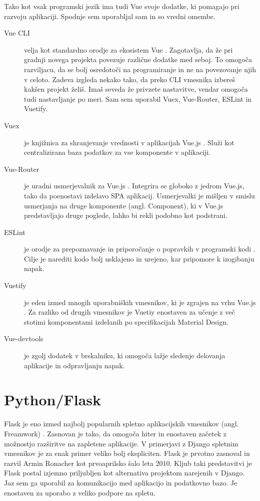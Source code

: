 \documentclass[a4paper, 12pt]{book}
\begin{document}
Tako kot vsak programski jezik ima tudi Vue svoje dodatke, ki pomagajo pri razvoju aplikaciji. Spodnje sem uporabljal sam in so vredni omembe.
\begin{description}
\item[Vue CLI] velja kot standardno orodje za ekosistem Vue \cite{VueCLI}. Zagotavlja, da že pri gradnji novega projekta povezuje različne dodatke med seboj. To omogoča razviljacu, da se bolj osredotoči na programiranje in ne na povezovanje njih v celoto. Zadeva izgleda nekako tako, da preko CLI vmesnika izbereš kakšen projekt želiš. Imaš seveda že privzete nastavitve, vendar omogoča tudi nastavljanje po meri. Sam sem uporabil Vuex, Vue-Router, ESLint in Vuetify.
\item[Vuex] je knjižnica za shranjevanje vrednosti v aplikacijah Vue.js \cite{Vuex}. Služi kot centralizirana baza podatkov za vse komponente v aplikaciji. 
\item[Vue-Router] je uradni usmerjevalnik za Vue.js \cite{VueRouter}. Integrira se globoko z jedrom Vue.js, tako da poenostavi izdelavo SPA aplikacij. Usmerjevalki je mišljen v smislu usmerjanja na druge komponente (angl. Component), ki v Vue.js predstavljajo druge poglede, lahko bi rekli podobno kot podstrani.
\item[ESLint] je orodje za prepoznavanje in priporočanje o popravkih v programski kodi \cite{ESLint}. Cilje je narediti kodo bolj usklajeno in urejeno, kar pripomore k izogibanju napak.
\item[Vuetify] je eden izmed mnogih uporabniških vmesnikov, ki je zgrajen na vrhu Vue.js \cite{Vuetify}. Za razliko od drugih vmesnikov je Vuetiy enostaven za učenje z več stotimi komponentami izdelanih po specifikacijah Material Design.
\item[Vue-devtools] je zgolj dodatek v brskalniku, ki omogoča lažje sledenje delovanja aplikacije in odpravljanju napak. 
\end{description}


\section {Python/Flask}
Flask je eno izmed najbolj popularnih spletno aplikacijskih vmesnikov (angl. Freamwork) \cite{Flask}. Zasnovan je tako, da omogoča hiter in enostaven začetek z možnostjo razširitve na zapletene aplikacije. V primerjavi z Django spletnim vmesnikov je za enak primer veliko bolj ekspliciten. Flask je prvotno zasnoval in razvil Armin Ronacher kot prvoaprilsko šalo leta 2010. Kljub taki predstavitvi je Flask postal izjemno priljubljen kot alternativa projektom narejenih v Django. Jaz sem ga uporabil za komunikacijo med aplikacijo in podatkovno bazo. Je enostaven za uporabo z veliko podpore na spletu. 
\end{document}
